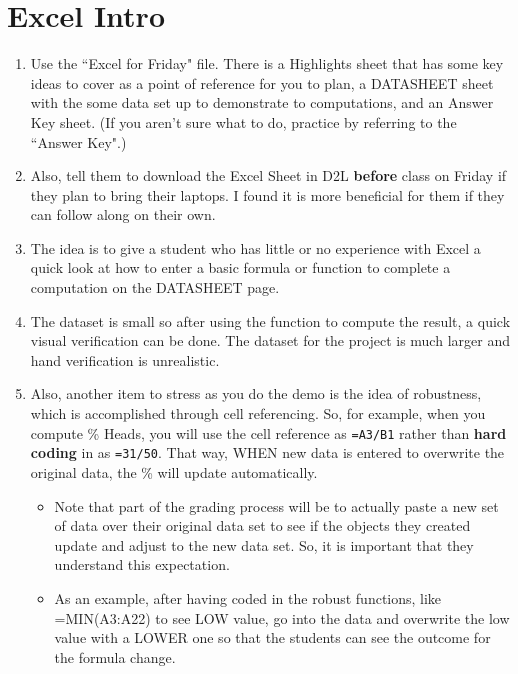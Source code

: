 \documentclass{article}
\begin{document}
\section*{Excel Intro}

    \begin{enumerate}
    
        \item Use the ``Excel for Friday" file.  There is a Highlights sheet that has some key ideas to cover as a point of reference for you to plan, a DATASHEET sheet with the some data set up to demonstrate to computations, and an Answer Key sheet.  (If you aren’t sure what to do, practice by referring to the ``Answer Key".)
        
        \item Also, tell them to download the Excel Sheet in D2L \textbf{before} class on Friday if they plan to bring their laptops. I found it is more beneficial for them if they can follow along on their own.
        
        \item The idea is to give a student who has little or no experience with Excel a quick look at how to enter a basic formula or function to complete a computation on the DATASHEET page.
        
        \item The dataset is small so after using the function to compute the result, a quick visual verification can be done. The dataset for the project is much larger and hand verification is unrealistic.
        
        \item Also, another item to stress as you do the demo is the idea of robustness, which is accomplished through cell referencing. So, for example, when you compute \% Heads, you will use the cell reference as \texttt{=A3/B1} rather than \textbf{hard coding} in as \texttt{=31/50}.  That way, WHEN new data is entered to overwrite the original data, the \% will update automatically.
        
            \begin{itemize}
            
                \item Note that part of the grading process will be to actually paste a new set of data over their original data set to see if the objects they created update and adjust to the new data set. So, it is important that they understand this expectation.
                
                \item As an example, after having coded in the robust functions, like =MIN(A3:A22) to see LOW value, go into the data and overwrite the low value with a LOWER one so that the students can see the outcome for the formula change.
                
            \end{itemize}
            
    \end{enumerate}
    
\end{document}
